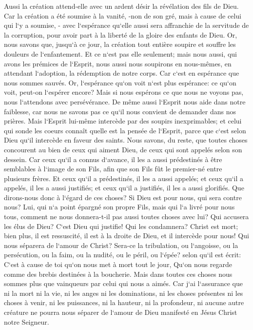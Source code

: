 \verse Aussi la création attend-elle avec un ardent désir la révélation des fils de Dieu. 
\verse Car la création a été soumise à la vanité, -non de son gré, mais à cause de celui qui l`y a soumise, - 
\verse avec l`espérance qu`elle aussi sera affranchie de la servitude de la corruption, pour avoir part à la liberté de la gloire des enfants de Dieu. 
\verse Or, nous savons que, jusqu`à ce jour, la création tout entière soupire et souffre les douleurs de l`enfantement. 
\verse Et ce n`est pas elle seulement; mais nous aussi, qui avons les prémices de l`Esprit, nous aussi nous soupirons en nous-mêmes, en attendant l`adoption, la rédemption de notre corps. 
\verse Car c`est en espérance que nous sommes sauvés. Or, l`espérance qu`on voit n`est plus espérance: ce qu`on voit, peut-on l`espérer encore? 
\verse Mais si nous espérons ce que nous ne voyons pas, nous l`attendons avec persévérance. 
\verse De même aussi l`Esprit nous aide dans notre faiblesse, car nous ne savons pas ce qu`il nous convient de demander dans nos prières. Mais l`Esprit lui-même intercède par des soupirs inexprimables; 
\verse et celui qui sonde les coeurs connaît quelle est la pensée de l`Esprit, parce que c`est selon Dieu qu`il intercède en faveur des saints. 
\verse Nous savons, du reste, que toutes choses concourent au bien de ceux qui aiment Dieu, de ceux qui sont appelés selon son dessein. 
\verse Car ceux qu`il a connus d`avance, il les a aussi prédestinés à être semblables à l`image de son Fils, afin que son Fils fût le premier-né entre plusieurs frères. 
\verse Et ceux qu`il a prédestinés, il les a aussi appelés; et ceux qu`il a appelés, il les a aussi justifiés; et ceux qu`il a justifiés, il les a aussi glorifiés. 
\verse Que dirons-nous donc à l`égard de ces choses? Si Dieu est pour nous, qui sera contre nous? 
\verse Lui, qui n`a point épargné son propre Fils, mais qui l`a livré pour nous tous, comment ne nous donnera-t-il pas aussi toutes choses avec lui? 
\verse Qui accusera les élus de Dieu? C`est Dieu qui justifie! 
\verse Qui les condamnera? Christ est mort; bien plus, il est ressuscité, il est à la droite de Dieu, et il intercède pour nous! 
\verse Qui nous séparera de l`amour de Christ? Sera-ce la tribulation, ou l`angoisse, ou la persécution, ou la faim, ou la nudité, ou le péril, ou l`épée? 
\verse selon qu`il est écrit: C`est à cause de toi qu`on nous met à mort tout le jour, Qu`on nous regarde comme des brebis destinées à la boucherie. 
\verse Mais dans toutes ces choses nous sommes plus que vainqueurs par celui qui nous a aimés. 
\verse Car j`ai l`assurance que ni la mort ni la vie, ni les anges ni les dominations, ni les choses présentes ni les choses à venir, 
\verse ni les puissances, ni la hauteur, ni la profondeur, ni aucune autre créature ne pourra nous séparer de l`amour de Dieu manifesté en Jésus Christ notre Seigneur. 

